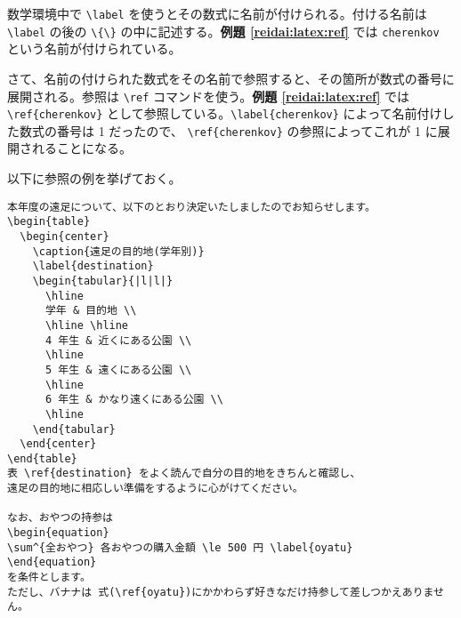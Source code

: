 数学環境中で \verb|\label| を使うとその数式に名前が付けられる。付ける名前は \verb|\label| の後の \verb|\{\}| の中に記述する。\textbf{例題 \ref{reidai:latex:ref}} では \texttt{cherenkov} という名前が付けられている。

さて、名前の付けられた数式をその名前で参照すると、その箇所が数式の番号に展開される。参照は \verb|\ref| コマンドを使う。\textbf{例題 \ref{reidai:latex:ref}} では \verb|\ref{cherenkov}| として参照している。\verb|\label{cherenkov}| によって名前付けした数式の番号は 1 だったので、 \verb|\ref{cherenkov}| の参照によってこれが 1 に展開されることになる。

以下に参照の例を挙げておく。
\begin{reidai}
\begin{verbatim}
本年度の遠足について、以下のとおり決定いたしましたのでお知らせします。
\begin{table}
  \begin{center}
    \caption{遠足の目的地(学年別)}
    \label{destination}
    \begin{tabular}{|l|l|}
      \hline
      学年 & 目的地 \\
      \hline \hline
      4 年生 & 近くにある公園 \\
      \hline
      5 年生 & 遠くにある公園 \\
      \hline
      6 年生 & かなり遠くにある公園 \\
      \hline
    \end{tabular}
  \end{center}
\end{table}
表 \ref{destination} をよく読んで自分の目的地をきちんと確認し、
遠足の目的地に相応しい準備をするように心がけてください。

なお、おやつの持参は
\begin{equation}
\sum^{全おやつ} 各おやつの購入金額 \le 500 円 \label{oyatu}
\end{equation}
を条件とします。
ただし、バナナは 式(\ref{oyatu})にかかわらず好きなだけ持参して差しつかえありません。
\end{verbatim}
\end{reidai}
\vspace*{-1.5em}

